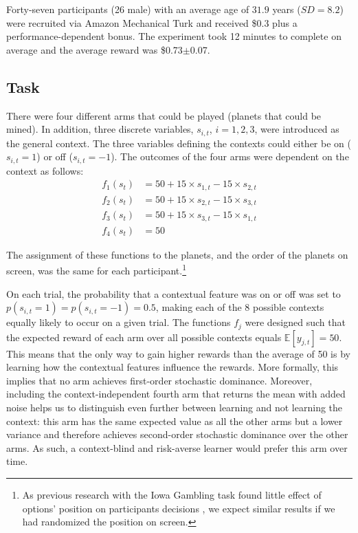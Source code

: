 \documentclass[a4paper,natbib]{apa6}
\begin{document}
Forty-seven participants (26 male) with an average age of $31.9$ years ($SD=8.2$) were recruited via Amazon Mechanical Turk and received \$0.3 plus a performance-dependent bonus. The experiment took 12 minutes to complete on average and the average reward was \$0.73$\pm$0.07.

\subsection{Task}
There were four different arms that could be played (planets that could be mined). In addition, three discrete variables, $s_{i,t}$, $i=1,2,3$, were introduced as the general context. The three variables defining the contexts could either be on ($s_{i,t} = 1$) or off ($s_{i,t} = -1$). The outcomes of the four arms were dependent on the context as follows:
%
\begin{align*}
f_1(s_t) &= 50 + 15\times s_{1,t} - 15\times s_{2,t}\\
f_2(s_t) &= 50+15\times s_{2,t} - 15\times s_{3,t}\\
f_3(s_t) &= 50+15\times s_{3,t} - 15\times s_{1,t}\\
f_4(s_t) &= 50
\end{align*}

The assignment of these functions to the planets, and the order of the planets on screen, was the same for each participant.\footnote{As previous research with the Iowa Gambling task found little effect of options' position on participants decisions \citep{chiu2007deck}, we expect similar results if we had randomized the position on screen.} 

On each trial, the probability that a contextual feature was on or off was set to $p(s_{i,t}=1)=p(s_{i,t}=-1)=0.5$, making each of the 8 possible contexts equally likely to occur on a given trial. The functions $f_j$ were designed such that the expected reward of each arm over all possible contexts equals $\mathbb{E}[y_{j,t}]=50$. 
This means that the only way to gain higher rewards than the average of 50 is by learning how the contextual features influence the rewards. More formally, this implies that no arm achieves first-order stochastic dominance. Moreover, including the context-independent fourth arm that returns the mean with added noise helps us to distinguish even further between learning and not learning the context: this arm has the same expected value as all the other arms but a lower variance and therefore achieves second-order stochastic dominance over the other arms. As such, a context-blind and risk-averse learner would prefer this arm over time.
\end{document}
